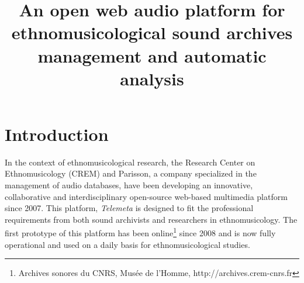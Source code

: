 \documentclass{paper}
\title{An open web audio platform for ethnomusicological sound archives management and automatic analysis}
\begin{document}
%
\maketitle
%



\section{Introduction}\label{sec:intro}


  In the context of ethnomusicological research, the Research Center on Ethnomusicology (CREM) and Parisson, a company specialized in the management of audio databases, have been developing an innovative, collaborative and interdisciplinary open-source web-based multimedia platform since 2007. 
This platform, \emph{Telemeta} is designed to fit the professional requirements from both sound archivists and researchers in ethnomusicology. The first prototype of this platform has been online\footnote{Archives sonores du CNRS, Musée de l'Homme, http://archives.crem-cnrs.fr} since 2008 and is now fully operational and used on a daily basis for ethnomusicological studies.
\end{document}

